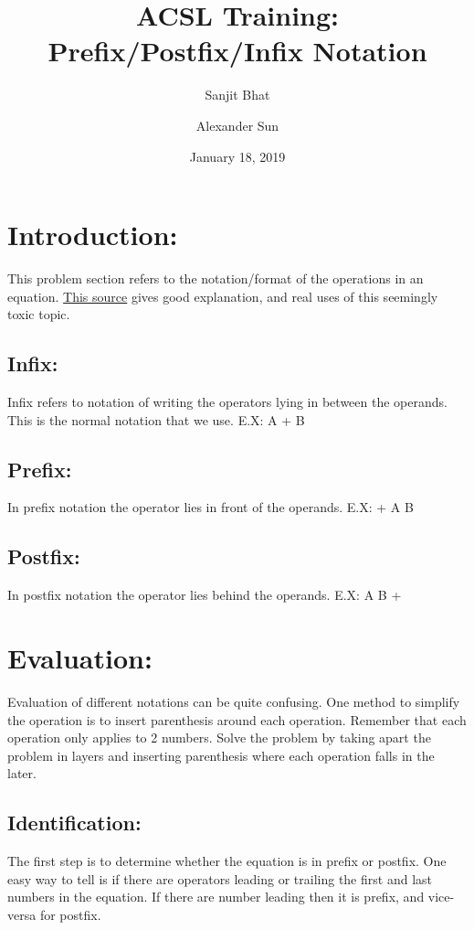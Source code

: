 \documentclass[11pt,letterpaper]{article}
\title{ACSL Training: Prefix/Postfix/Infix Notation}
\author{Sanjit Bhat \and Alexander Sun}
\date{January 18, 2019}
\begin{document}
\maketitle

\section{Introduction:}
This problem section refers to the notation/format of the operations in an equation.
\href{http://interactivepython.org/runestone/static/pythonds/BasicDS/InfixPrefixandPostfixExpressions.html}{This source} gives good explanation, and real uses of this seemingly toxic topic.

\subsection{Infix:}
Infix refers to notation of writing the operators lying in between the operands. This is the normal notation that we use. E.X: A + B

\subsection{Prefix:}
In prefix notation the operator lies in front of the operands. E.X: + A B

\subsection{Postfix:}
In postfix notation the operator lies behind the operands. E.X: A B +

\section{Evaluation:}
Evaluation of different notations can be quite confusing. One method to simplify the operation is to insert parenthesis around each operation. Remember that each operation only applies to 2 numbers. Solve the problem by taking apart the problem in layers and inserting parenthesis where each operation falls in the later. 

\subsection{Identification:}
The first step is to determine whether the equation is in prefix or postfix. One easy way to tell is if there are operators leading or trailing the first and last numbers in the equation. If there are number leading then it is prefix, and vice-versa for postfix.
\end{document}
